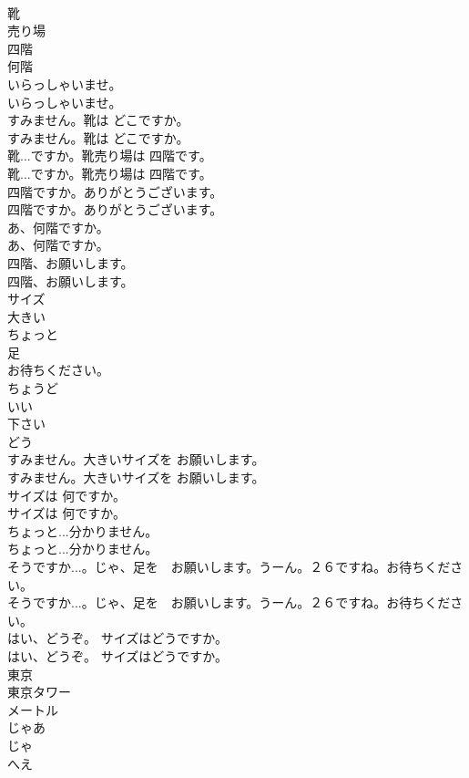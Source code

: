 \documentclass[8pt]{extreport}
\begin{document}
\begin{CJK}{UTF8}{min}
\\	靴
\\	売り場
\\	四階
\\	何階
\\	いらっしゃいませ。	
\\	いらっしゃいませ。 
\\	すみません。靴は どこですか。	
\\	すみません。靴は どこですか。 
\\	靴...ですか。靴売り場は 四階です。	
\\	靴...ですか。靴売り場は 四階です。 
\\	四階ですか。ありがとうございます。	
\\	四階ですか。ありがとうございます。 
\\	あ、何階ですか。	
\\	あ、何階ですか。 
\\	四階、お願いします。	
\\	四階、お願いします。 
\\	サイズ
\\	大きい
\\	ちょっと
\\	足
\\	お待ちください。
\\	ちょうど
\\	いい
\\	下さい
\\	どう
\\	すみません。大きいサイズを お願いします。	
\\	すみません。大きいサイズを お願いします。 
\\	サイズは 何ですか。	
\\	サイズは 何ですか。 
\\	ちょっと...分かりません。	
\\	ちょっと...分かりません。 
\\	そうですか...。じゃ、足を　お願いします。うーん。２６ですね。お待ちください。	
\\	そうですか...。じゃ、足を　お願いします。うーん。２６ですね。お待ちください。 
\\	はい、どうぞ。 サイズはどうですか。	
\\	はい、どうぞ。 サイズはどうですか。 
\\	東京
\\	東京タワー
\\	メートル
\\	じゃあ 
\\	じゃ
\\	へえ

\end{CJK}
\end{document}
